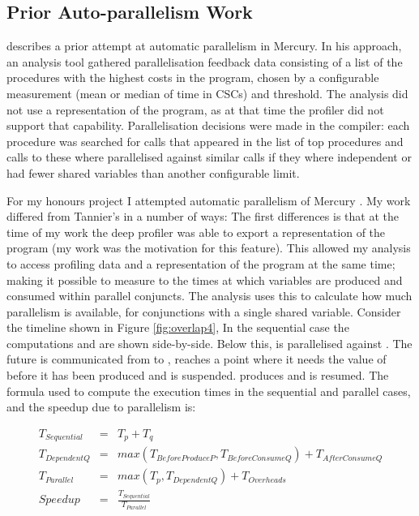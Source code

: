 \subsection{Prior Auto-parallelism Work}
\label{sec:backgnd_priorautopar}

\citet{tannier:2007:parallel_mercury} describes a prior attempt at automatic
parallelism in Mercury.
In his approach, 
an analysis tool gathered parallelisation feedback data consisting of
a list of the procedures with the highest costs in the program,
chosen by a configurable measurement (mean or median of time in CSCs) and threshold.
The analysis did not use a representation of the program,
as at that time the profiler did not support that capability.
Parallelisation decisions were made in the compiler:
each procedure was searched for calls that appeared in the list of top procedures
and calls to these where parallelised against similar calls if they
where independent or had fewer shared variables than another configurable limit.

For my honours project I attempted automatic parallelism of Mercury
\citep{bone:2008:hons}.
My work differed from Tannier's in a number of ways:
The first differences is that at the time of my work the deep profiler
was able to export a representation of the program
(my work was the motivation for this feature).
This allowed my analysis to access profiling data and a representation
of the program at the same time;
making it possible to measure to the times at which variables are produced
and consumed within parallel conjuncts.
The analysis uses this to calculate how much parallelism is available,
for conjunctions with a single shared variable.
Consider the timeline shown in Figure \ref{fig:overlap4},
In the sequential case the computations  and  are shown
side-by-side.
Below this,  is parallelised against .
The future  is communicated from  to ,
 reaches a point where it needs the value of  before it has
been produced and is suspended.
 produces  and  is resumed.
The formula used to compute the execution times in the sequential and parallel
cases, and the speedup due to parallelism is:


\begin{eqnarray*}
T_{Sequential} & = & T_p + T_q \\
T_{DependentQ} & = & max(T_{BeforeProduceP}, T_{BeforeConsumeQ}) +
T_{AfterConsumeQ} \\
T_{Parallel} & = & max(T_p, T_{DependentQ}) + T_{Overheads} \\
Speedup & = & \frac{T_{Sequential}}{T_{Parallel}}
\end{eqnarray*}

